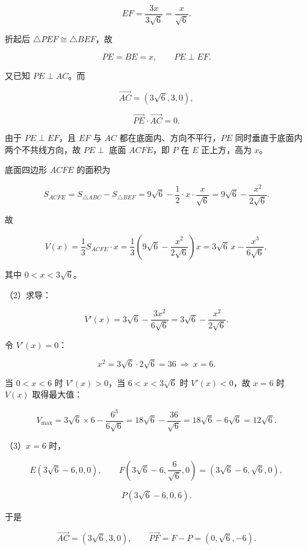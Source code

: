 \begin{answer}
\nopagebreak[4]
\[EF=\frac{3x}{3\sqrt6}=\frac{x}{\sqrt6}.\]

折起后 $\triangle PEF\cong\triangle BEF$，故

\nopagebreak[4]
\[PE=BE=x,\qquad PE\perp EF.\]

又已知 $PE\perp AC$。而

\nopagebreak[4]
\[\overrightarrow{AC}=(3\sqrt6,3,0),\]

\nopagebreak[4]
\[\overrightarrow{PE}\cdot\overrightarrow{AC}=0.\]

由于 $PE\perp EF$，且 $EF$ 与 $AC$ 都在底面内、方向不平行，$PE$ 同时垂直于底面内两个不共线方向，故 $PE\perp$ 底面 $ACFE$，即 $P$ 在 $E$ 正上方，高为 $x$。

底面四边形 $ACFE$ 的面积为

\nopagebreak[4]
\[S_{ACFE}=S_{\triangle ABC}-S_{\triangle BEF}=9\sqrt6-\frac12\cdot x\cdot\frac{x}{\sqrt6}=9\sqrt6-\frac{x^2}{2\sqrt6}.\]

故

\nopagebreak[4]
\[V(x)=\frac13S_{ACFE}\cdot x=\frac13\left(9\sqrt6-\frac{x^2}{2\sqrt6}\right)x=3\sqrt6\,x-\frac{x^3}{6\sqrt6},\]

其中 $0<x<3\sqrt6$。

（2）求导：

\nopagebreak[4]
\[V'(x)=3\sqrt6-\frac{3x^2}{6\sqrt6}=3\sqrt6-\frac{x^2}{2\sqrt6}.\]

令 $V'(x)=0$：

\nopagebreak[4]
\[x^2=3\sqrt6\cdot2\sqrt6=36\ \Rightarrow\ x=6.\]

当 $0<x<6$ 时 $V'(x)>0$，当 $6<x<3\sqrt6$ 时 $V'(x)<0$，故 $x=6$ 时 $V(x)$ 取得最大值：

\nopagebreak[4]
\[V_{\max}=3\sqrt6\times6-\frac{6^3}{6\sqrt6}=18\sqrt6-\frac{36}{\sqrt6}=18\sqrt6-6\sqrt6=12\sqrt6.\]

（3）$x=6$ 时，

\nopagebreak[4]
\[E(3\sqrt6-6,0,0),\qquad F\left(3\sqrt6-6,\frac{6}{\sqrt6},0\right)=(3\sqrt6-6,\sqrt6,0),\]

\nopagebreak[4]
\[P(3\sqrt6-6,0,6).\]

于是

\nopagebreak[4]
\[\overrightarrow{AC}=(3\sqrt6,3,0),\qquad \overrightarrow{PF}=F-P=(0,\sqrt6,-6).\]


\end{answer}
